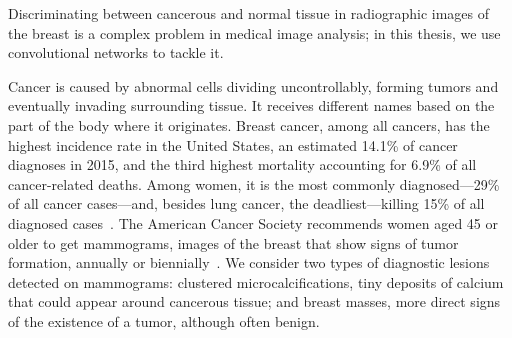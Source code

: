 
Discriminating between cancerous and normal tissue in radiographic images of the breast is a complex problem in medical image analysis; in this thesis, we use convolutional networks to tackle it.

Cancer is caused by abnormal cells dividing uncontrollably, forming tumors and eventually invading surrounding tissue. It receives different names based on the part of the body where it originates. 
Breast cancer, among all cancers, has the highest incidence rate in the United States, an estimated 14.1\% of cancer diagnoses in 2015, and the third highest mortality accounting for 6.9\% of all cancer-related deaths. 
Among women, it is the most commonly diagnosed---29\% of all cancer cases---and, besides lung cancer, the deadliest---killing 15\% of all diagnosed cases~\cite{ACS2015}. The American Cancer Society recommends women aged 45 or older to get mammograms, images of the breast that show signs of tumor formation, annually or biennially~\cite{Oeffinger2015}. We consider two types of diagnostic lesions detected on mammograms: clustered microcalcifications, tiny deposits of calcium that could appear around cancerous tissue; and breast masses, more direct signs of the existence of a tumor, although often benign.

